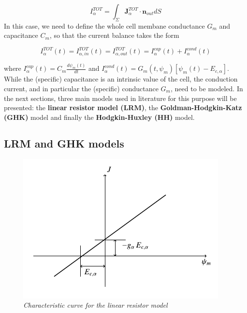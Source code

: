 \documentclass[a4paper]{article}
\begin{document}
	\begin{equation}
		I_{\alpha}^{TOT} = \int_{\Sigma} \textbf{J}_{\alpha}^{TOT} \cdot \textbf{n}_{out} dS 
	\end{equation} 
In this case, we need to define the whole cell membane conductance $ G_m$ and capacitance $ C_m $, so that the current balance takes the form

\begin{equation}
	I_{\alpha}^{TOT}(t) = I_{\alpha,in}^{TOT}(t) =I_{\alpha,out}^{TOT}(t) = I_{\alpha}^{cap}(t) + I_{\alpha}^{cond}(t)
\end{equation}
	
where $  I_{\alpha}^{cap}(t) = C_m \frac{d \psi_m(t)}{d t}$ and $ I_{\alpha}^{cond}(t) = G_m(t,\psi_m) [\psi_m(t) - E_{c,\alpha}]$.\\
While the (specific) capacitance is an intrinsic value of the cell, the conduction current, and  in particular the (specific) conductance $G_m$, need to be modeled. In the next sections, three main models used in literature for this purpose will be presented: the \textbf{linear resistor model (LRM)}, the \textbf{Goldman-Hodgkin-Katz (GHK)} model and finally the \textbf{Hodgkin-Huxley (HH)} model.\\


	
	
\subsection{LRM and GHK models}

\begin{figure}[H]
	\begin{center}
		\includegraphics[scale=0.77]{LRM.png} 
	\end{center} 
	\caption{\textit{Characteristic curve for the linear resistor model}}
	
\end{figure}
\end{document}
